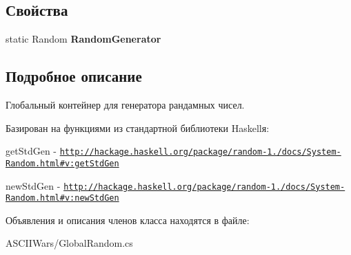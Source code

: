 \subsection*{Свойства}
\begin{DoxyCompactItemize}
\item 
\hypertarget{class_a_s_c_i_i_wars_1_1_global_random_a9d81774ce986f79fb427fd575463d63b}{}\label{class_a_s_c_i_i_wars_1_1_global_random_a9d81774ce986f79fb427fd575463d63b} 
static Random {\bfseries Random\+Generator}
\end{DoxyCompactItemize}


\subsection{Подробное описание}
Глобальный контейнер для генератора рандамных чисел. 

Базирован на функциями из стандартной библиотеки Haskell\textquotesingle{}я\+:
\begin{DoxyItemize}
\item {\ttfamily get\+Std\+Gen} -\/ \href{http://hackage.haskell.org/package/random-1.1/docs/System-Random.html#v:getStdGen}{\tt http\+://hackage.\+haskell.\+org/package/random-\/1./docs/\+System-\/\+Random.\+html\#v\+:get\+Std\+Gen}
\item {\ttfamily new\+Std\+Gen} -\/ \href{http://hackage.haskell.org/package/random-1.1/docs/System-Random.html#v:newStdGen}{\tt http\+://hackage.\+haskell.\+org/package/random-\/1./docs/\+System-\/\+Random.\+html\#v\+:new\+Std\+Gen} 
\end{DoxyItemize}

Объявления и описания членов класса находятся в файле\+:\begin{DoxyCompactItemize}
\item 
A\+S\+C\+I\+I\+Wars/Global\+Random.\+cs\end{DoxyCompactItemize}
